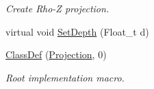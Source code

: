 \begin{DoxyCompactItemize}
\begin{DoxyCompactList}\small\item\em Create Rho-\/Z projection. \item\end{DoxyCompactList}\item 
virtual void \hyperlink{class_d_d4hep_1_1_projection_a6c7fc010be5b3df698158c82b56c9cde}{SetDepth} (Float\_\-t d)
\item 
\hyperlink{class_d_d4hep_1_1_projection_a32d78dc00500fcb000ce25052c96fd62}{ClassDef} (\hyperlink{class_d_d4hep_1_1_projection}{Projection}, 0)
\begin{DoxyCompactList}\small\item\em Root implementation macro. \item\end{DoxyCompactList}\end{DoxyCompactItemize}
